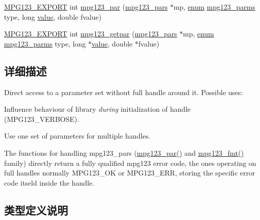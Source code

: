 \begin{DoxyCompactItemize}
\item 
\hyperlink{mpg123_8h_a2ba98cfba3f760879df70e755b2a61cc}{M\+P\+G123\+\_\+\+E\+X\+P\+O\+RT} int \hyperlink{group__mpg123__advpar_gacf5f968dde49b648327ef601d9ff0367}{mpg123\+\_\+par} (\hyperlink{group__mpg123__advpar_ga3983578625af3bb6dc7e3b74d0cab4aa}{mpg123\+\_\+pars} $\ast$mp, \hyperlink{interfaceenum}{enum} \hyperlink{group__mpg123__init_ga73a8ff3363028b89afc72b3ea032b9cb}{mpg123\+\_\+parms} type, long \hyperlink{unionvalue}{value}, double fvalue)
\item 
\hyperlink{mpg123_8h_a2ba98cfba3f760879df70e755b2a61cc}{M\+P\+G123\+\_\+\+E\+X\+P\+O\+RT} int \hyperlink{group__mpg123__advpar_ga290f6cf33a625af1376249b75eb8e7c8}{mpg123\+\_\+getpar} (\hyperlink{group__mpg123__advpar_ga3983578625af3bb6dc7e3b74d0cab4aa}{mpg123\+\_\+pars} $\ast$mp, \hyperlink{interfaceenum}{enum} \hyperlink{group__mpg123__init_ga73a8ff3363028b89afc72b3ea032b9cb}{mpg123\+\_\+parms} type, long $\ast$\hyperlink{unionvalue}{value}, double $\ast$fvalue)
\end{DoxyCompactItemize}


\subsection{详细描述}
Direct access to a parameter set without full handle around it. Possible uses\+:
\begin{DoxyItemize}
\item Influence behaviour of library {\itshape during} initialization of handle (M\+P\+G123\+\_\+\+V\+E\+R\+B\+O\+SE).
\item Use one set of parameters for multiple handles.
\end{DoxyItemize}

The functions for handling mpg123\+\_\+pars (\hyperlink{group__mpg123__advpar_gacf5f968dde49b648327ef601d9ff0367}{mpg123\+\_\+par()} and \hyperlink{group__mpg123__advpar_ga481219fd8962c7b7ab69d4c8daebc094}{mpg123\+\_\+fmt()} family) directly return a fully qualified mpg123 error code, the ones operating on full handles normally M\+P\+G123\+\_\+\+OK or M\+P\+G123\+\_\+\+E\+RR, storing the specific error code itseld inside the handle. 

\subsection{类型定义说明}
\mbox{\label{group__mpg123__advpar_ga3983578625af3bb6dc7e3b74d0cab4aa}} 
